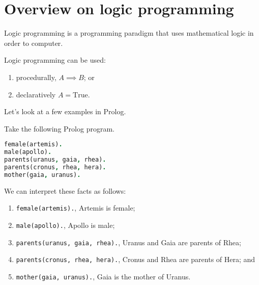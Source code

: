 \section{Overview on logic programming}

\begin{definition}
    Logic programming is a programming paradigm that uses mathematical logic in order to computer.
\end{definition}

Logic programming can be used:

\begin{enumerate}
    \item procedurally, $A \implies B$; or
    \item declaratively $A = \text{True}$.
\end{enumerate}

Let's look at a few examples in Prolog.

\begin{example}
    Take the following Prolog program.
    \begin{lstlisting}[language = Prolog]
female(artemis).
male(apollo).
parents(uranus, gaia, rhea).
parents(cronus, rhea, hera).
mother(gaia, uranus).
    \end{lstlisting}
    We can interpret these facts as follows:
    \begin{enumerate}
        \item \texttt{female(artemis).}, Artemis is female;
        \item \texttt{male(apollo).}, Apollo is male;
        \item \texttt{parents(uranus, gaia, rhea).}, Uranus and Gaia are parents of Rhea;
        \item \texttt{parents(cronus, rhea, hera).}, Cronus and Rhea are parents of Hera; and
        \item \texttt{mother(gaia, uranus).}, Gaia is the mother of Uranus.
    \end{enumerate}
\end{example}


